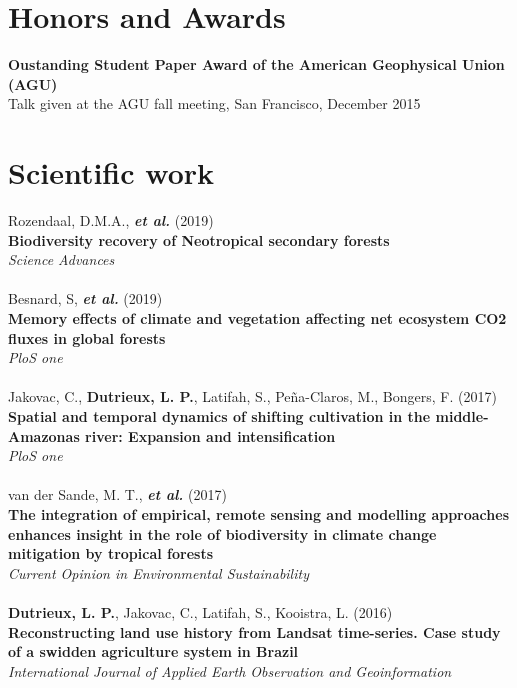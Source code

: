 \documentclass[]{friggeri-cv}
\begin{document}
\section{Honors and Awards}
	\textbf{Oustanding Student Paper Award of the American Geophysical Union (AGU)}\\
	Talk given at the AGU fall meeting, San Francisco, December 2015\\

\section{Scientific work}
    Rozendaal, D.M.A., \textbf{\textit{et al.}} (2019)\\
    \textbf{Biodiversity recovery of Neotropical secondary forests}\\
    \textit{Science Advances}\\
    \\
    Besnard, S, \textbf{\textit{et al.}} (2019)\\
    \textbf{Memory effects of climate and vegetation affecting net ecosystem CO2 fluxes in global forests}\\
    \textit{PloS one}\\
    \\
    Jakovac, C., \textbf{Dutrieux, L. P.}, Latifah, S., Pe\~{n}a-Claros, M., Bongers, F. (2017)\\
    \textbf{Spatial and temporal dynamics of shifting cultivation in the middle-Amazonas river: Expansion and intensification}\\
    \textit{PloS one}\\
    \\
    van der Sande, M. T., \textbf{\textit{et al.}} (2017)\\
    \textbf{The integration of empirical, remote sensing and modelling approaches enhances insight in the role of biodiversity in climate change mitigation by tropical forests}\\
    \textit{Current Opinion in Environmental Sustainability}\\
    \\
    \textbf{Dutrieux, L. P.}, Jakovac, C., Latifah, S., Kooistra, L. (2016)\\
    \textbf{Reconstructing land use history from Landsat time-series. Case study of a swidden agriculture system in Brazil}\\
    \textit{International Journal of Applied Earth Observation and Geoinformation}\\
\end{document}
